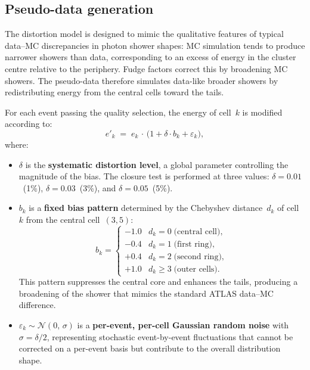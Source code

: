 \documentclass[12pt,a4paper]{article}
\begin{document}
\subsection{Pseudo-data generation}
\label{sec:method:pseudodata}

The distortion model is designed to mimic the qualitative features of typical
data--MC discrepancies in photon shower shapes: MC simulation tends to produce
narrower showers than data, corresponding to an excess of energy in the
cluster centre relative to the periphery. Fudge factors correct this by
broadening MC showers. The pseudo-data therefore simulates data-like broader
showers by redistributing energy from the central cells toward the tails.

For each event passing the quality selection, the energy of cell~$k$ is
modified according to:
\begin{equation}
  e'_k \;=\; e_k \,\cdot\, \bigl(1 + \delta\cdot b_k + \varepsilon_k\bigr),
  \label{eq:distortion}
\end{equation}
where:
\begin{itemize}
  \item $\delta$ is the \textbf{systematic distortion level}, a global
        parameter controlling the magnitude of the bias. The closure test is
        performed at three values: $\delta=0.01$~(1\%), $\delta=0.03$~(3\%),
        and $\delta=0.05$~(5\%).
  \item $b_k$ is a \textbf{fixed bias pattern} determined by the Chebyshev
        distance~$d_k$ of cell~$k$ from the central cell~$(3,5)$:
        \begin{equation}
          b_k = \begin{cases}
            -1.0 & d_k = 0 \;\text{(central cell)}, \\
            -0.4 & d_k = 1 \;\text{(first ring)}, \\
            +0.4 & d_k = 2 \;\text{(second ring)}, \\
            +1.0 & d_k \geq 3 \;\text{(outer cells)}.
          \end{cases}
          \label{eq:biaspattern}
        \end{equation}
        This pattern suppresses the central core and enhances the tails,
        producing a broadening of the shower that mimics the standard
        ATLAS data--MC difference.
  \item $\varepsilon_k \sim \mathcal{N}(0,\,\sigma)$ is a
        \textbf{per-event, per-cell Gaussian random noise} with
        $\sigma = \delta/2$, representing stochastic event-by-event
        fluctuations that cannot be corrected on a per-event basis but
        contribute to the overall distribution shape.
\end{itemize}
\end{document}
